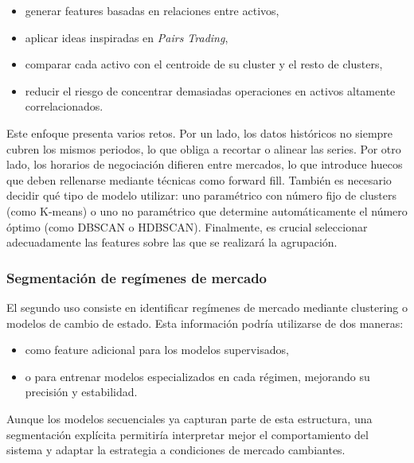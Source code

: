 \begin{itemize}
    \item generar features basadas en relaciones entre activos,
    \item aplicar ideas inspiradas en \textit{Pairs Trading},
    \item comparar cada activo con el centroide de su cluster y el resto de clusters,
    \item reducir el riesgo de concentrar demasiadas operaciones en activos altamente correlacionados.
\end{itemize}

Este enfoque presenta varios retos. Por un lado, los datos históricos no siempre cubren los mismos periodos, lo que obliga a recortar o alinear las
series. Por otro lado, los horarios de negociación difieren entre mercados, lo que introduce huecos que deben rellenarse mediante técnicas como
forward fill. También es necesario decidir qué tipo de modelo utilizar: uno paramétrico con número fijo de clusters (como K-means) o uno no
paramétrico que determine automáticamente el número óptimo (como DBSCAN o HDBSCAN). Finalmente, es crucial seleccionar adecuadamente las features
sobre las que se realizará la agrupación.

\subsubsection{Segmentación de regímenes de mercado}

El segundo uso consiste en identificar regímenes de mercado mediante clustering o modelos de cambio de estado. Esta información podría utilizarse de
dos maneras:

\begin{itemize}
    \item como feature adicional para los modelos supervisados,
    \item o para entrenar modelos especializados en cada régimen, mejorando su precisión y estabilidad.
\end{itemize}

Aunque los modelos secuenciales ya capturan parte de esta estructura, una segmentación explícita permitiría interpretar mejor el comportamiento del
sistema y adaptar la estrategia a condiciones de mercado cambiantes.


